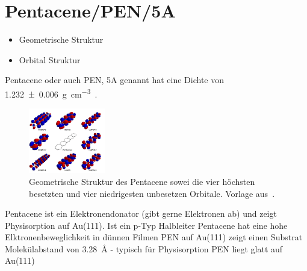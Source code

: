    \section{Pentacene/PEN/5A}
        \begin{itemize}
            \item Geometrische Struktur
            \item Orbital Struktur
        \end{itemize}
        Pentacene oder auch PEN, 5A genannt hat eine Dichte von \SI{1.232(6)}{\gram\per\cubic\centi\meter}~\cite{CAS}.
        
        \begin{figure}
            \centering
            \includegraphics[width=0.3\textwidth]{./content/PEN.jpg}
            \caption{Geometrische Struktur des Pentacene sowei die vier höchsten besetzten und vier niedrigesten unbesetzen Orbitale. Vorlage aus~\cite{PEN}.}
            \label{fig:PEN}
        \end{figure}
        
        \textbf{\cite{5A_1}}
        Pentacene ist ein Elektronendonator (gibt gerne Elektronen ab) und zeigt Physisorption auf Au(111).
        Ist ein p-Typ Halbleiter
        Pentacene hat eine hohe Elktronenbeweglichkeit in dünnen Filmen
        PEN auf Au(111) zeigt einen Substrat Molekülabstand von \SI{3.28}{\angstrom} - typisch für Physisorption
        PEN liegt glatt auf Au(111)
    